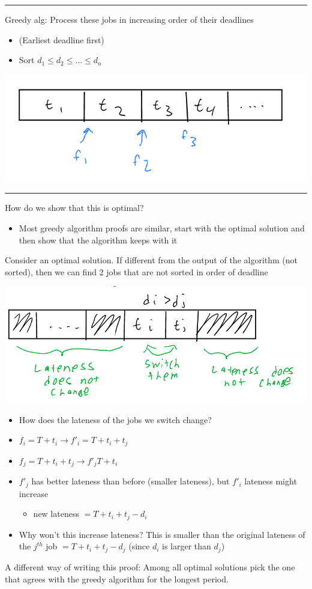 \documentclass[11pt]{article}
\begin{document}
\noindent\rule{\textwidth}{0.5pt}
Greedy alg: Process these jobs in increasing order of their deadlines
\begin{itemize}
\item (Earliest deadline first)
\item Sort \(d_1 \leq d_2 \leq \ldots \leq d_n\)
\end{itemize}
\begin{center}
\includegraphics[width=.9\linewidth]{./Images/i33.png}
\end{center}

\noindent\rule{\textwidth}{0.5pt}
How do we show that this is optimal?
\begin{itemize}
\item Most greedy algorithm proofs are similar, start with the optimal solution and then show that the algorithm keeps with it
\end{itemize}
Consider an optimal solution. If different from the output of the algorithm (not sorted), then we can find 2 jobs that are not sorted in order of deadline
\begin{center}
\includegraphics[width=.9\linewidth]{./Images/i34.png}
\end{center}
\begin{itemize}
\item How does the lateness of the jobs we switch change?
\item \(f_i = T + t_i \rightarrow f'_i = T+t_i+t_j\)
\item \(f_j = T + t_i + t_j \rightarrow f'_j T + t_i\)
\item \(f'_j\) has better lateness than before (smaller lateness), but \(f'_i\) lateness might increase
\begin{itemize}
\item new lateness \(= T+t_i+t_j - d_i\)
\end{itemize}
\item Why won't this increase lateness? This is smaller than the original lateness of the \(j^{th}\) job \(= T+t_i+t_j- d_j\) (since \(d_i\) is larger than \(d_j\))
\end{itemize}
A different way of writing this proof: Among all optimal solutions pick the one that agrees with the greedy algorithm for the longest period.
\end{document}
